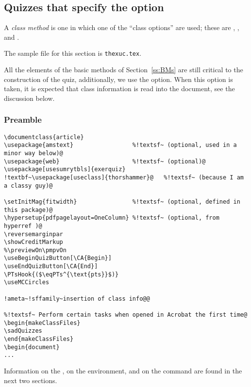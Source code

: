 \documentclass{article}
\let\tops\texorpdfstring
\def\FmtMP#1{\marginpar{\small\itshape\raggedleft#1}}
\edef\amtIndent{\the\parindent}
\begin{document}
\subsection{Quizzes that specify the \tops{\protect{}}{useclass} option}\label{ss:uc}

A \textit{class method}\FmtMP{class method} is one in which one of the ``class options'' are used;
these are , , and .

\newtopic\noindent
The sample file for this section is \texttt{thexuc.tex}.

\newtopic\noindent
All the elements of the basic methods of Section~\ref{ss:BMs} are still
critical to the construction of the quiz, additionally, we use the
 option. When this option is taken, it is expected that class
information is read into the document, see the discussion below.

\subsubsection{Preamble}

\begin{Verbatim}[xleftmargin=\amtIndent,fontsize=\small,commandchars={!~@}]
\documentclass{article}
\usepackage{amstext}                 %!textsf~ (optional, used in a minor way below)@
\usepackage{web}                     %!textsf~ (optional)@
\usepackage[usesumrytbls]{exerquiz}
!textbf~\usepackage[useclass]{thorshammer}@   %!textsf~ (because I am a classy guy)@

\setInitMag{fitwidth}                %!textsf~ (optional, defined in this package)@
\hypersetup{pdfpagelayout=OneColumn} %!textsf~ (optional, from hyperref )@
\reversemarginpar
\showCreditMarkup
%\previewOn\pmpvOn
\useBeginQuizButton[\CA{Begin}]
\useEndQuizButton[\CA{End}]
\PTsHook{($\eqPTs^{\text{pts}}$)}
\useMCCircles

!ameta~!sffamily~insertion of class info@@

%!textsf~ Perform certain tasks when opened in Acrobat the first time@
\begin{makeClassFiles}
\sadQuizzes
\end{makeClassFiles}
\begin{document}
...
\end{Verbatim}
Information on the , on the
 environment, and on the  command are
found in the next two sections.
\end{document}
